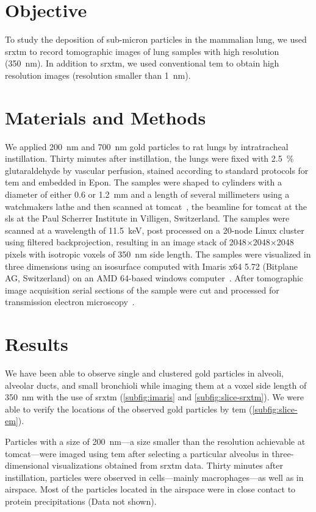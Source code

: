 \section{Objective}
To study the deposition of sub-micron particles in the mammalian lung, we used \ac{srxtm} to record tomographic images of lung samples with high resolution (\SI{350}{\nano\meter}). In addition to \ac{srxtm}, we used conventional \ac{tem} to obtain high resolution images (resolution smaller than \SI{1}{\nano\meter}).

\section{Materials and Methods}
We applied \SI{200}{\nano\meter} and \SI{700}{\nano\meter} gold particles to rat lungs by intratracheal instillation. Thirty minutes after instillation, the lungs were fixed with \SI{2.5}{\%} glutaraldehyde by vascular perfusion, stained according to standard protocols for \ac{tem} and embedded in Epon. The samples were shaped to cylinders with a diameter of either 0.6 or \SI{1.2}{\milli\meter} and a length of several millimeters using a watchmakers lathe and then scanned at \ac{tomcat}~\cite{Stampanoni2007}, the beamline for \acl{tomcat} at the \acl{sls} at the Paul Scherrer Institute in Villigen, Switzerland. The samples were scanned at a wavelength of \SI{11.5}{\kilo\electronvolt}, post processed on a 20-node Linux cluster using filtered backprojection, resulting in an image stack of 2048$\times$2048$\times$2048 pixels with isotropic voxels of \SI{350}{\nano\meter} side length. The samples were visualized in three dimensions using an isosurface computed with Imaris x64 5.72 (Bitplane AG, Switzerland) on an AMD 64-based windows computer~\cite{Tsuda2008}. After tomographic image acquisition serial sections of the sample were cut and processed for transmission electron microscopy~\cite{Mund2008}. 

\section{Results}
We have been able to observe single and clustered gold particles in alveoli, alveolar ducts, and small bronchioli while imaging them at a voxel side length of \SI{350}{\nano\meter} with the use of \ac{srxtm} (\autoref{subfig:imaris} and \ref{subfig:slice-srxtm}). We were able to verify the locations of the observed gold particles by \ac{tem} (\autoref{subfig:slice-em}). 

Particles with a size of \SI{200}{\nano\meter}---a size smaller than the resolution achievable at \ac{tomcat}---were imaged using \ac{tem} after selecting a particular alveolus in three-dimensional visualizations obtained from \ac{srxtm} data. Thirty minutes after instillation, particles were observed in cells---mainly macrophages---as well as in airspace. Most of the particles located in the airspace were in close contact to protein precipitations (Data not shown).


